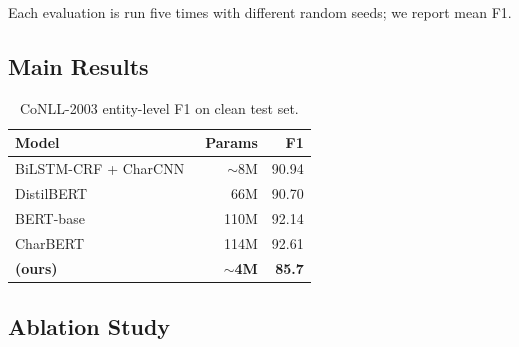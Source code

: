 Each evaluation is run five times with different random seeds; we report mean
F1.

\subsection{Main Results}

\begin{table}[h]
\centering
\caption{CoNLL-2003 entity-level F1 on clean test set.}
\label{tab:clean}
\begin{tabular}{lrr}
\toprule
\textbf{Model} & \textbf{Params} & \textbf{F1} \\
\midrule
BiLSTM-CRF + CharCNN~\citep{ma2016end}  & $\sim$8M  & 90.94 \\
DistilBERT~\citep{sanh2019distilbert}   & 66M       & 90.70 \\
BERT-base~\citep{devlin2019bert}        & 110M      & 92.14 \\
CharBERT~\citep{ma2020charbert}         & 114M      & 92.61 \\
\midrule
\textbf{\LightRet{} (ours)}             & \textbf{$\sim$4M} & \textbf{85.7} \\
\bottomrule
\end{tabular}
\end{table}

\begin{table}[h]
\centering
\caption{NER F1 under character noise.  \textbf{Bold} = best per column.}
\label{tab:noisy}
\end{table}

\subsection{Ablation Study}


